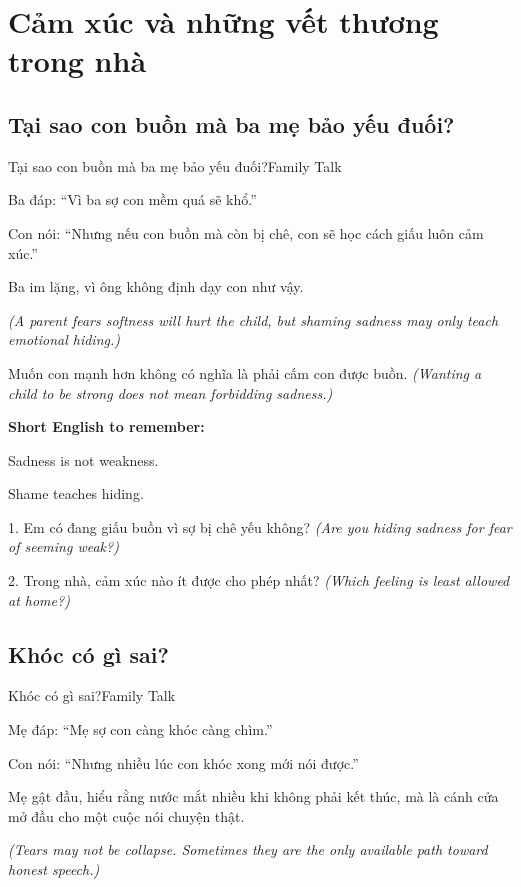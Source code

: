 \chapter{Cảm xúc và những vết thương trong nhà}

\section{Tại sao con buồn mà ba mẹ bảo yếu đuối?}
\begin{truyen}{Tại sao con buồn mà ba mẹ bảo yếu đuối?}{Family Talk}

Ba đáp: ``Vì ba sợ con mềm quá sẽ khổ.''

Con nói: ``Nhưng nếu con buồn mà còn bị chê, con sẽ học cách giấu luôn cảm xúc.''

Ba im lặng, vì ông không định dạy con như vậy.

\textit{(A parent fears softness will hurt the child, but shaming sadness may only teach emotional hiding.)}
\end{truyen}

\begin{baihoc}
Muốn con mạnh hơn không có nghĩa là phải cấm con được buồn.
\textit{(Wanting a child to be strong does not mean forbidding sadness.)}
\end{baihoc}

\begin{ghinhoanh}
\textbf{Short English to remember:}

Sadness is not weakness.

Shame teaches hiding.
\end{ghinhoanh}

\begin{tuhocnhanh}
1. Em có đang giấu buồn vì sợ bị chê yếu không? \textit{(Are you hiding sadness for fear of seeming weak?)}

2. Trong nhà, cảm xúc nào ít được cho phép nhất? \textit{(Which feeling is least allowed at home?)}
\end{tuhocnhanh}
\ngancach

\section{Khóc có gì sai?}
\begin{truyen}{Khóc có gì sai?}{Family Talk}

Mẹ đáp: ``Mẹ sợ con càng khóc càng chìm.''

Con nói: ``Nhưng nhiều lúc con khóc xong mới nói được.''

Mẹ gật đầu, hiểu rằng nước mắt nhiều khi không phải kết thúc, mà là cánh cửa mở đầu cho một cuộc nói chuyện thật.

\textit{(Tears may not be collapse. Sometimes they are the only available path toward honest speech.)}
\end{truyen}


